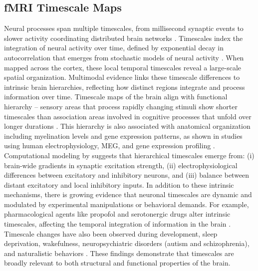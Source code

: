 \documentclass[9pt]{article}
\begin{document}
\subsection{fMRI Timescale Maps}
Neural processes span multiple timescales, from millisecond synaptic events to slower activity coordinating distributed brain networks \citep{buzsaki_large-scale_2004}. Timescales index the integration of neural activity over time, defined by exponential decay in autocorrelation that emerges from stochastic models of neural activity \citep[Supplementary Mathematical Note]{murray_hierarchy_2014}. When mapped across the cortex, these local temporal timescales reveal a large-scale spatial organization. Multimodal evidence links these timescale differences to intrinsic brain hierarchies, reflecting how distinct regions integrate and process information over time. Timescale maps of the brain align with functional hierarchy -- sensory areas that process rapidly changing stimuli show shorter timescales than association areas involved in cognitive processes that unfold over longer durations \citep{raut_hierarchical_2020, gao_neuronal_2020, hasson_hierarchy_2008, murray_hierarchy_2014, stephens_place_2013}. This hierarchy is also associated with anatomical organization including myelination levels and gene expression patterns, as shown in studies using human electrophysiology, MEG, and gene expression profiling \citep{gao_neuronal_2020, shafiei_neurophysiological_2023}.\\

Computational modeling by \citet{li_hierarchical_2022} suggests that hierarchical timescales emerge from: (i) brain-wide gradients in synaptic excitation strength, (ii) electrophysiological differences between excitatory and inhibitory neurons, and (iii) balance between distant excitatory and local inhibitory inputs. In addition to these intrinsic mechanisms, there is growing evidence that neuronal timescales are dynamic and modulated by experimental manipulations or behavioral demands. For example, pharmacological agents like propofol and serotonergic drugs alter intrinsic timescales, affecting the temporal integration of information in the brain \citep{huang_timescales_2018, shinn_functional_2023}. Timescale changes have also been observed during development, sleep deprivation, wakefulness, neuropsychiatric disorders (autism and schizophrenia), and naturalistic behaviors \citep{martin-burgos_development_2024, meisel_decline_2017, watanabe_atypical_2019, wengler_distinct_2020, manea_neural_2024}. These findings demonstrate that timescales are broadly relevant to both structural and functional properties of the brain.\\
\end{document}
